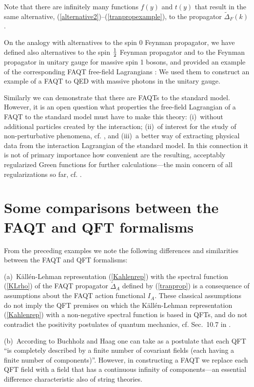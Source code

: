 \documentclass[a4paper,12pt]{article}
\newcommand{\half}{{\textstyle{1\over2}}}
\newcommand{\prop}{\widetilde{\Delta}}
\newcommand{\propF}{\prop_F}
\newcommand{\propA}{\prop_A}
\begin{document}
Note that there are infinitely many functions $f(y)$ and $t(y)$ that result in the same alternative, (\ref{alternative2})--(\ref{tranpropexample}), to the propagator $\propF(k)$.

On the analogy with alternatives to the spin 0 Feynman propagator, we have defined also alternatives to the spin $\half$ Feynman propagator and to the Feynman propagator in unitary gauge for massive spin 1 bosons, and provided an example of the corresponding FAQT free-field Lagrangians \cite{mi003}: We used them to construct an example of a FAQT to QED with massive photons in the unitary gauge.

Similarly we can demonstrate that there are FAQTs to the standard model. However, it is an open question what properties the free-field Lagrangian of a FAQT to the standard model must have to make this theory: (i)~without additional particles created by the interaction; (ii)~of interest for the study of non-perturbative phenomena, cf. \cite{Gupta}, and (iii)~a better way of extracting physical data from the interaction Lagrangian of the standard model. In this connection it is not of primary importance how convenient are the resulting, acceptably regularized Green functions for further calculations---the main concern of all regularizations so far, cf. \cite{Deminov}.

\section{Some comparisons between the FAQT and QFT formalisms}
\label{seccomp}

From the preceding examples we note the following differences and similarities between the FAQT and QFT formalisms:

(a)~K\"all\'en-Lehman representation (\ref{Kahlenrep}) with the spectral function (\ref{KLrho}) of the FAQT propagator $\propA$ defined by (\ref{tranprop}) is a consequence of assumptions about the FAQT action functional $I_A$. These classical  assumptions do not imply the QFT premises on which the K\"all\'en-Lehman representation (\ref{Kahlenrep}) with a non-negative spectral function is based in QFTs, and do not contradict the positivity postulates of quantum mechanics, cf. Sec.~10.7 in \cite{Weinberg}.

(b)~According to Buchholz and Haag \cite{Buchholz} one can take as a postulate that each QFT ``is completely described by a finite number of covariant fields (each having a finite number of components)''. However, in constructing a FAQT we replace  each QFT field with a field that has a continuous infinity of components---an essential difference characteristic also of string theories.
\end{document}
